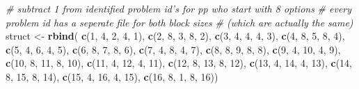 \documentclass[11pt,,]{article}
\newenvironment{Shaded}{\begin{snugshade}}{\end{snugshade}}
\newcommand{\KeywordTok}[1]{\textcolor[rgb]{0.13,0.29,0.53}{\textbf{{#1}}}}
\newcommand{\DecValTok}[1]{\textcolor[rgb]{0.00,0.00,0.81}{{#1}}}
\newcommand{\StringTok}[1]{\textcolor[rgb]{0.31,0.60,0.02}{{#1}}}
\newcommand{\CommentTok}[1]{\textcolor[rgb]{0.56,0.35,0.01}{\textit{{#1}}}}
\newcommand{\NormalTok}[1]{{#1}}
\begin{document}
\begin{Shaded}
\begin{Highlighting}[]
{{{{{{\CommentTok{# subtract 1 from identified problem id's for pp who start with 8 options}
\CommentTok{# every problem id has a seperate file for both block sizes }
\CommentTok{# (which are actually the same)}
\NormalTok{struct <-}\StringTok{ }\KeywordTok{rbind}\NormalTok{(}
\KeywordTok{c}\NormalTok{(}\DecValTok{1}\NormalTok{, }\DecValTok{4}\NormalTok{, }\DecValTok{2}\NormalTok{, }\DecValTok{4}\NormalTok{, }\DecValTok{1}\NormalTok{),}
\KeywordTok{c}\NormalTok{(}\DecValTok{2}\NormalTok{, }\DecValTok{8}\NormalTok{, }\DecValTok{3}\NormalTok{, }\DecValTok{8}\NormalTok{, }\DecValTok{2}\NormalTok{),}
\KeywordTok{c}\NormalTok{(}\DecValTok{3}\NormalTok{, }\DecValTok{4}\NormalTok{, }\DecValTok{4}\NormalTok{, }\DecValTok{4}\NormalTok{, }\DecValTok{3}\NormalTok{),}
\KeywordTok{c}\NormalTok{(}\DecValTok{4}\NormalTok{, }\DecValTok{8}\NormalTok{, }\DecValTok{5}\NormalTok{, }\DecValTok{8}\NormalTok{, }\DecValTok{4}\NormalTok{),}
\KeywordTok{c}\NormalTok{(}\DecValTok{5}\NormalTok{, }\DecValTok{4}\NormalTok{, }\DecValTok{6}\NormalTok{, }\DecValTok{4}\NormalTok{, }\DecValTok{5}\NormalTok{),}
\KeywordTok{c}\NormalTok{(}\DecValTok{6}\NormalTok{, }\DecValTok{8}\NormalTok{, }\DecValTok{7}\NormalTok{, }\DecValTok{8}\NormalTok{, }\DecValTok{6}\NormalTok{),}
\KeywordTok{c}\NormalTok{(}\DecValTok{7}\NormalTok{, }\DecValTok{4}\NormalTok{, }\DecValTok{8}\NormalTok{, }\DecValTok{4}\NormalTok{, }\DecValTok{7}\NormalTok{),}
\KeywordTok{c}\NormalTok{(}\DecValTok{8}\NormalTok{, }\DecValTok{8}\NormalTok{, }\DecValTok{9}\NormalTok{, }\DecValTok{8}\NormalTok{, }\DecValTok{8}\NormalTok{),}
\KeywordTok{c}\NormalTok{(}\DecValTok{9}\NormalTok{, }\DecValTok{4}\NormalTok{, }\DecValTok{10}\NormalTok{, }\DecValTok{4}\NormalTok{, }\DecValTok{9}\NormalTok{),}
\KeywordTok{c}\NormalTok{(}\DecValTok{10}\NormalTok{, }\DecValTok{8}\NormalTok{, }\DecValTok{11}\NormalTok{, }\DecValTok{8}\NormalTok{, }\DecValTok{10}\NormalTok{),}
\KeywordTok{c}\NormalTok{(}\DecValTok{11}\NormalTok{, }\DecValTok{4}\NormalTok{, }\DecValTok{12}\NormalTok{, }\DecValTok{4}\NormalTok{, }\DecValTok{11}\NormalTok{),}
\KeywordTok{c}\NormalTok{(}\DecValTok{12}\NormalTok{, }\DecValTok{8}\NormalTok{, }\DecValTok{13}\NormalTok{, }\DecValTok{8}\NormalTok{, }\DecValTok{12}\NormalTok{),}
\KeywordTok{c}\NormalTok{(}\DecValTok{13}\NormalTok{, }\DecValTok{4}\NormalTok{, }\DecValTok{14}\NormalTok{, }\DecValTok{4}\NormalTok{, }\DecValTok{13}\NormalTok{),}
\KeywordTok{c}\NormalTok{(}\DecValTok{14}\NormalTok{, }\DecValTok{8}\NormalTok{, }\DecValTok{15}\NormalTok{, }\DecValTok{8}\NormalTok{, }\DecValTok{14}\NormalTok{),}
\KeywordTok{c}\NormalTok{(}\DecValTok{15}\NormalTok{, }\DecValTok{4}\NormalTok{, }\DecValTok{16}\NormalTok{, }\DecValTok{4}\NormalTok{, }\DecValTok{15}\NormalTok{),}
\KeywordTok{c}\NormalTok{(}\DecValTok{16}\NormalTok{, }\DecValTok{8}\NormalTok{, }\DecValTok{1}\NormalTok{, }\DecValTok{8}\NormalTok{, }\DecValTok{16}\NormalTok{))}

}}}}}}
\end{Highlighting}
\end{Shaded}
\end{document}
